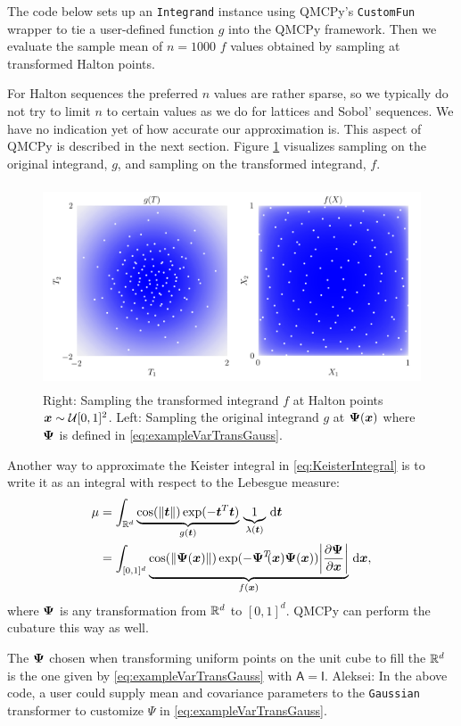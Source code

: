 \documentclass[graybox,footinfo]{svmult}
\newcommand{\QMCPYabs}[1]{\ensuremath{{\left \lvert #1 \right \rvert}}}
\newcommand{\AGSComment}[1]{{\color{cyan} Aleksei: #1}}
\newcommand{\mA}{\mathsf{A}}
\newcommand{\mI}{\mathsf{I}}
\begin{document}
The code below sets up an \texttt{Integrand} instance using QMCPy's \texttt{CustomFun} wrapper to tie a user-defined function $g$ into the QMCPy framework.  Then we evaluate the sample mean of $n=1000$ $f$ values obtained by sampling at transformed Halton points.

For Halton sequences the preferred $n$ values are rather sparse, so we typically do not try to limit $n$ to certain values as we do for lattices and Sobol' sequences.  We have no indication yet of how accurate our approximation is.  This aspect of QMCPy is described in the next section.  Figure \ref{fig:ikc} visualizes sampling on the original integrand, $g$, and sampling on the transformed integrand, $f$. 

\begin{figure}
	\includegraphics[height=6cm]{QMCSoftwareArticle/figs/i_keister_contours.png}
	\caption{Right: Sampling the transformed integrand $f$ at Halton points ${\boldsymbol{x}} \sim {\mathcal{U}}[0,1]^2$. Left: Sampling the original integrand $g$ at ${\boldsymbol{\Psi}}({\boldsymbol{x}})$ where ${\boldsymbol{\Psi}}$ is defined in \eqref{eq:exampleVarTransGauss}.  } \label{fig:ikc}
\end{figure}

Another way to approximate the Keister integral in \eqref{eq:KeisterIntegral} is to write it as an integral with respect to the Lebesgue measure:
\begin{align*} 
	\mu 
	& = \int_{\bbR^d} \underbrace{\cos(\lVert \bst \rVert) \exp(-\bst^T \bst) }_{g(\bst)} \, \underbrace{1}_{\lambda(\bst)} \,\D \bst \\
	& = \int_{[0,1]^d} \underbrace{\cos(\lVert \bsPsi(\bsx) \rVert) \exp(-\bsPsi^T\!\!(\bsx) \bsPsi(\bsx)) \QMCPYabs{\frac{\partial \bsPsi}{\partial \bsx}} }_{f(\bsx)} \, \D \bsx,
\end{align*}
where ${\boldsymbol{\Psi}}$ is any transformation from ${\mathbb{R}}^d$ to $[0,1]^d$.  QMCPy can perform the cubature this way as well.

The ${\boldsymbol{\Psi}}$ chosen when transforming uniform points on the unit cube to fill the ${\mathbb{R}}^d$ is the one given by \eqref{eq:exampleVarTransGauss} with $\mA = \mI$. \AGSComment{In the above code, a user could supply mean and covariance parameters to the \texttt{Gaussian} transformer to customize $\Psi$ in \eqref{eq:exampleVarTransGauss}.}
\end{document}
